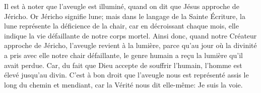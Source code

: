 Il est à noter que l’aveugle est illuminé,
	quand on dit que Jésus approche de Jéricho.
Or Jéricho signifie lune;
	mais dans le langage de la Sainte Écriture,
	la lune représente la déficience de la chair,
	car en décroissant chaque mois,
		elle indique la vie défaillante de notre corps mortel.
Ainsi donc, quand notre Créateur approche de Jéricho,
	l’aveugle revient à la lumière,
	parce qu’au jour où la divinité a pris avec elle notre chair défaillante,
	le genre humain a reçu la lumière qu’il avait perdue.
Car, du fait que Dieu accepte de souffrir l’humain,
	l’homme est élevé jusqu’au divin.
C’est à bon droit que l’aveugle nous est représenté
	assis le long du chemin et mendiant,
	car la Vérité nous dit elle-même: Je suis la voie.
